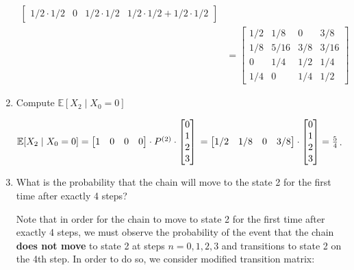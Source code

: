 \documentclass[12pt,twoside, letter]{exam}
\theoremstyle{definition}
\newcommand{\ee}{\mathbb{E}}
\begin{document}
\begin{enumerate}
\begin{solution}
\begin{align*}
\begin{bmatrix}
            1/2\cdot1/2 & 0 & 1/2\cdot1/2 & 1/2\cdot1/2 + 1/2\cdot1/2
          \end{bmatrix}
          \\&=
          \begin{bmatrix}
            1/2 & 1/8 & 0 & 3/8 \\
            1/8 & 5/16 & 3/8 & 3/16  \\
            0 & 1/4 & 1/2 & 1/4 \\
            1/4 & 0 & 1/4 & 1/2
          \end{bmatrix}
      \end{align*}
    \end{solution}
  \item Compute $\ee[X_2 \mid X_0 = 0]$
    \begin{solution}
      $\ee[X_2 \mid X_0 = 0] =
      \begin{bmatrix}
        1 & 0 & 0 & 0
      \end{bmatrix}
      \cdot P^{(2)} \cdot
      \begin{bmatrix}
        0 \\
        1 \\
        2 \\
        3 \\
      \end{bmatrix}
      \\
      = \begin{bmatrix}
        1/2 & 1/8 & 0 & 3/8
      \end{bmatrix} \cdot
      \begin{bmatrix}
        0 \\
        1 \\
        2 \\
        3 \\
      \end{bmatrix}
      = \frac{5}{4}$.
    \end{solution}
  \item What is the probability that the chain will move to the state 2 for the first time after exactly 4 steps?
    \begin{solution}
      Note that in order for the chain to move to state 2 for the first time after exactly 4 steps, we must observe the probability of the event that
      the chain \textbf{ does not move }to state 2 at steps $n = 0, 1, 2, 3$ and transitions to state 2 on the 4th step. In order to do so, we consider modified transition matrix:
      \begin{align*}

\end{align*}
\end{solution}
\end{enumerate}
\end{document}

